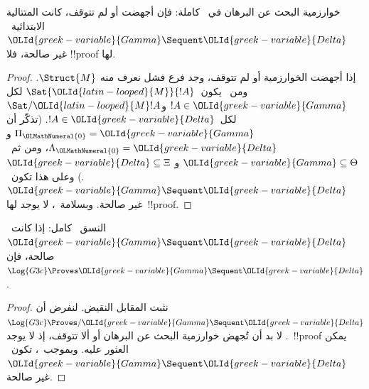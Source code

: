 \documentclass[../../../include/open-logic-section]{subfiles}
\begin{document}
\begin{cor}
خوارزمية البحث عن البرهان في~ كاملة: فإن أجهضت أو لم تتوقف،
كانت المتتالية الابتدائية~$\OLId{greek-variable}{Gamma} \Sequent \OLId{greek-variable}{Delta}$ غير صالحة، فلا
!!{proof} لها.
\end{cor}

\begin{proof}
  إذا أجهضت الخوارزمية أو لم تتوقف، وجد فرع فشل نعرف منه
  $\Struct{M}$. ومن~ يكون~$\Sat{\OLId{latin-looped}{M}}{!A}$ لكل
  $!A\in\OLId{greek-variable}{Gamma}$ و$\Sat/{\OLId{latin-looped}{M}}{!A}$ لكل~$!A\in\OLId{greek-variable}{Delta}$. (تذكّر أن
  $\Pi_\OLMathNumeral{0}=\OLId{greek-variable}{Gamma}$ و$\Lambda_\OLMathNumeral{0}=\OLId{greek-variable}{Delta}$، ومن ثم~$\OLId{greek-variable}{Gamma}\subseteq\Theta$ و
  $\OLId{greek-variable}{Delta}\subseteq\Xi$.) وعلى هذا تكون~$\OLId{greek-variable}{Gamma} \Sequent \OLId{greek-variable}{Delta}$ غير صالحة.
  وبسلامة~، لا يوجد لها~!!{proof}.
\end{proof}

\begin{cor}
النسق~ كامل: إذا كانت~$\OLId{greek-variable}{Gamma} \Sequent \OLId{greek-variable}{Delta}$ صالحة، فإن
$\Log{G3c}\Proves\OLId{greek-variable}{Gamma} \Sequent \OLId{greek-variable}{Delta}$.
\end{cor}

\begin{proof}
  نثبت المقابل النقيض. لنفرض أن
  $\Log{G3c}\Proves/\OLId{greek-variable}{Gamma} \Sequent \OLId{greek-variable}{Delta}$. لا بد أن تُجهض خوارزمية
  البحث عن البرهان أو ألا تتوقف، إذ لا يوجد~!!{proof} يمكن العثور عليه.
  وبموجب~، تكون~$\OLId{greek-variable}{Gamma} \Sequent \OLId{greek-variable}{Delta}$ غير صالحة.
\end{proof}
\end{document}

